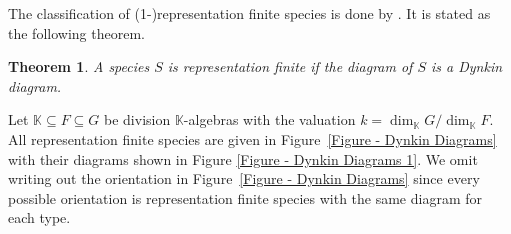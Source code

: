 \documentclass[a4paper, reqno]{amsart}
\newtheorem{mythm}{Theorem}[section]
\theoremstyle{definition}
\newcommand{\K}{\mathbb{K}}
\begin{document}
The classification of (1-)representation finite species is done by \cite{dlab1975algebras}. It is stated as the following theorem.

\begin{mythm}\cite[Theorem B]{dlab1975algebras}\label{theorem - dlab ringel}
	A species $S$ is representation finite if the diagram of $S$ is a Dynkin diagram.
\end{mythm}

Let $\K\subseteq F\subseteq G$ be division $\K$-algebras with the valuation $k=\dim_\K G / \dim_\K F$. All representation finite species are given in Figure~\ref{Figure - Dynkin Diagrams} with their diagrams shown in Figure \ref{Figure - Dynkin Diagrams 1}. We omit writing out the orientation in Figure~\ref{Figure - Dynkin Diagrams} since every possible orientation is representation finite species with the same diagram for each type.
\end{document}
